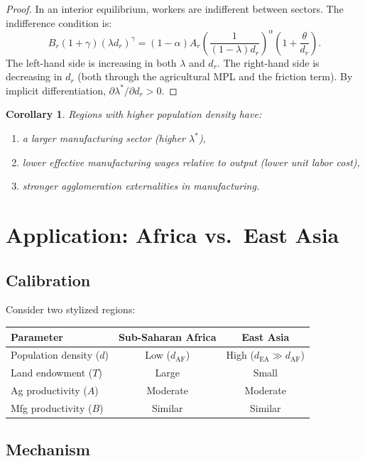 \documentclass[12pt]{article}
\newtheorem{corollary}{Corollary}
\newcommand{\pd}{\partial}
\begin{document}
\begin{proof}
In an interior equilibrium, workers are indifferent between sectors. The indifference condition is:
\[
    B_r(1+\gamma)(\lambda d_r)^\gamma = (1-\alpha)A_r \left(\frac{1}{(1-\lambda)d_r}\right)^\alpha \left(1 + \frac{\theta}{d_r}\right).
\]
The left-hand side is increasing in both $\lambda$ and $d_r$. The right-hand side is decreasing in $d_r$ (both through the agricultural MPL and the friction term). By implicit differentiation, $\pd \lambda^* / \pd d_r > 0$.
\end{proof}

\begin{corollary}
Regions with higher population density have:
\begin{enumerate}
    \item a larger manufacturing sector (higher $\lambda^*$),
    \item lower effective manufacturing wages relative to output (lower unit labor cost),
    \item stronger agglomeration externalities in manufacturing.
\end{enumerate}
\end{corollary}

\section{Application: Africa vs.\ East Asia}

\subsection{Calibration}

Consider two stylized regions:
\begin{center}
\begin{tabular}{lcc}
\hline
Parameter & Sub-Saharan Africa & East Asia \\
\hline
Population density ($d$) & Low ($d_{\text{AF}}$) & High ($d_{\text{EA}} \gg d_{\text{AF}}$) \\
Land endowment ($T$) & Large & Small \\
Ag productivity ($A$) & Moderate & Moderate \\
Mfg productivity ($B$) & Similar & Similar \\
\hline
\end{tabular}
\end{center}

\subsection{Mechanism}
\end{document}
